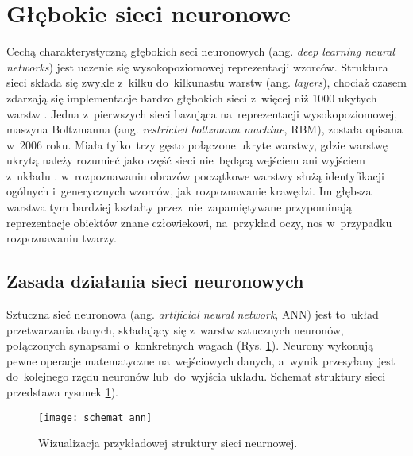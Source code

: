 \section{Głębokie sieci neuronowe}

Cechą charakterystyczną głębokich seci neuronowych (ang. \textit{deep learning neural networks}) jest uczenie się wysokopoziomowej reprezentacji wzorców. Struktura sieci składa się zwykle z~kilku do~kilkunastu warstw (ang. \textit{layers}), chociaż czasem zdarzają się implementacje bardzo głębokich sieci z~więcej niż 1000 ukytych warstw \cite{He2015DeepRL}. Jedna z~pierwszych sieci bazująca na~reprezentacji wysokopoziomowej, maszyna Boltzmanna (ang. \textit{restricted boltzmann machine}, RBM), została opisana w~2006 roku. Miała tylko~trzy gęsto połączone ukryte warstwy, gdzie warstwę ukrytą należy rozumieć jako część sieci nie~będącą wejściem ani wyjściem z~układu \cite{Hinton2006AFL}. w~rozpoznawaniu obrazów początkowe warstwy służą identyfikacji ogólnych i~generycznych wzorców, jak rozpoznawanie krawędzi. Im głębsza warstwa tym bardziej kształty przez~nie~zapamiętywane przypominają reprezentacje obiektów znane człowiekowi, na~przykład oczy, nos w~przypadku rozpoznawaniu twarzy.

\subsection{Zasada działania sieci neuronowych}
Sztuczna sieć neuronowa (ang. \textit{artificial neural network}, ANN) jest to~układ przetwarzania danych, składający się z~warstw sztucznych neuronów, połączonych synapsami o~konkretnych wagach (Rys. \ref{fig:ann_visualisation}). Neurony wykonują pewne operacje matematyczne na~wejściowych danych, a~wynik przesyłany jest do~kolejnego rzędu neuronów lub~do~wyjścia układu. Schemat struktury sieci przedstawa rysunek \ref{fig:ann_visualisation}).

\begin{figure}[h!]
	\centering
	\centering
		\texttt{[image: schemat\_ann]}	
	\caption{Wizualizacja przykładowej struktury sieci neurnowej.}
	\label{fig:ann_visualisation}
\end{figure}

